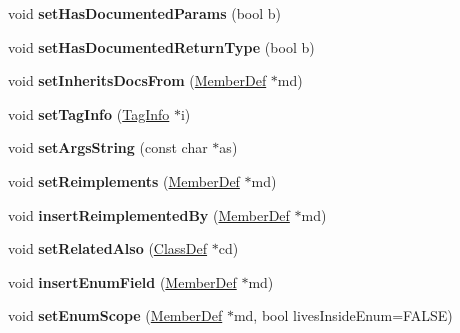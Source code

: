 \begin{DoxyCompactItemize}
\mbox{\label{class_member_def_a105bb9da9ad6116e49376717f81f8e1c}} 
void {\bfseries set\+Has\+Documented\+Params} (bool b)
\item 
\mbox{\label{class_member_def_af5fea59efd61c336be4ce8f2512462da}} 
void {\bfseries set\+Has\+Documented\+Return\+Type} (bool b)
\item 
\mbox{\label{class_member_def_ac954130cf0256b3a62d3352a2be509c6}} 
void {\bfseries set\+Inherits\+Docs\+From} (\mbox{\hyperlink{class_member_def}{Member\+Def}} $\ast$md)
\item 
\mbox{\label{class_member_def_a85ece0f615fcfea7afc4ec292c6c178d}} 
void {\bfseries set\+Tag\+Info} (\mbox{\hyperlink{struct_tag_info}{Tag\+Info}} $\ast$i)
\item 
\mbox{\label{class_member_def_a267f127e937748855fae0eef67d00d15}} 
void {\bfseries set\+Args\+String} (const char $\ast$as)
\item 
\mbox{\label{class_member_def_a09e58c33ed93f5594e2ff977f3c9f0e5}} 
void {\bfseries set\+Reimplements} (\mbox{\hyperlink{class_member_def}{Member\+Def}} $\ast$md)
\item 
\mbox{\label{class_member_def_a6f07bd65e01b676333cef75724a24de2}} 
void {\bfseries insert\+Reimplemented\+By} (\mbox{\hyperlink{class_member_def}{Member\+Def}} $\ast$md)
\item 
\mbox{\label{class_member_def_a3cd1972eb433e20bfdd107e3df7a22e6}} 
void {\bfseries set\+Related\+Also} (\mbox{\hyperlink{class_class_def}{Class\+Def}} $\ast$cd)
\item 
\mbox{\label{class_member_def_ac4380f8c77ff8bcf2082ed4b9cb08d3c}} 
void {\bfseries insert\+Enum\+Field} (\mbox{\hyperlink{class_member_def}{Member\+Def}} $\ast$md)
\item 
\mbox{\label{class_member_def_a11a7cb96316131c806c6d4a12a5e11fd}} 
void {\bfseries set\+Enum\+Scope} (\mbox{\hyperlink{class_member_def}{Member\+Def}} $\ast$md, bool lives\+Inside\+Enum=F\+A\+L\+SE)

\end{DoxyCompactItemize}

